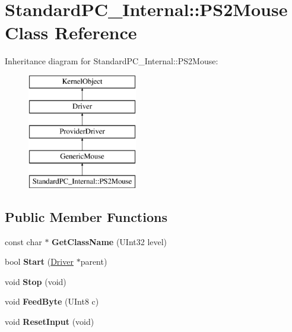 \hypertarget{class_standard_p_c___internal_1_1_p_s2_mouse}{}\section{Standard\+P\+C\+\_\+\+Internal\+:\+:P\+S2\+Mouse Class Reference}
\label{class_standard_p_c___internal_1_1_p_s2_mouse}
Inheritance diagram for Standard\+P\+C\+\_\+\+Internal\+:\+:P\+S2\+Mouse\+:\begin{figure}[H]
\begin{center}
\leavevmode
\includegraphics[height=5.000000cm]{class_standard_p_c___internal_1_1_p_s2_mouse}
\end{center}
\end{figure}
\subsection*{Public Member Functions}
\begin{DoxyCompactItemize}
\item 
\mbox{\label{class_standard_p_c___internal_1_1_p_s2_mouse_a3b874fd8a75bd75bdcde90eb4b50a3e6}} 
const char $\ast$ {\bfseries Get\+Class\+Name} (U\+Int32 level)
\item 
\mbox{\label{class_standard_p_c___internal_1_1_p_s2_mouse_abb22af09833998dd69ad671c8918819a}} 
bool {\bfseries Start} (\hyperlink{class_driver}{Driver} $\ast$parent)
\item 
\mbox{\label{class_standard_p_c___internal_1_1_p_s2_mouse_a1b35a845d2ede91aedce08f5ebb64e64}} 
void {\bfseries Stop} (void)
\item 
\mbox{\label{class_standard_p_c___internal_1_1_p_s2_mouse_a5b14962deabe496e544035819eb7096d}} 
void {\bfseries Feed\+Byte} (U\+Int8 c)
\item 
\mbox{\label{class_standard_p_c___internal_1_1_p_s2_mouse_ab3e6605535efeab888b730c575a1bee1}} 
void {\bfseries Reset\+Input} (void)
\end{DoxyCompactItemize}
